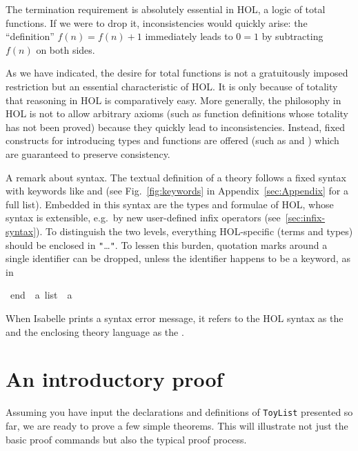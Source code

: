 \begin{isabellebody}
\begin{isamarkuptext}
The termination requirement is absolutely essential in HOL, a logic of total
functions. If we were to drop it, inconsistencies would quickly arise: the
``definition'' $f(n) = f(n)+1$ immediately leads to $0 = 1$ by subtracting
$f(n)$ on both sides.

\begin{warn}
  As we have indicated, the desire for total functions is not a gratuitously
  imposed restriction but an essential characteristic of HOL. It is only
  because of totality that reasoning in HOL is comparatively easy.  More
  generally, the philosophy in HOL is not to allow arbitrary axioms (such as
  function definitions whose totality has not been proved) because they
  quickly lead to inconsistencies. Instead, fixed constructs for introducing
  types and functions are offered (such as  and
  ) which are guaranteed to preserve consistency.
\end{warn}

A remark about syntax.  The textual definition of a theory follows a fixed
syntax with keywords like  and  (see
Fig.~\ref{fig:keywords} in Appendix~\ref{sec:Appendix} for a full list).
Embedded in this syntax are the types and formulae of HOL, whose syntax is
extensible, e.g.\ by new user-defined infix operators
(see~\ref{sec:infix-syntax}). To distinguish the two levels, everything
HOL-specific (terms and types) should be enclosed in
\texttt{"}\dots\texttt{"}. 
To lessen this burden, quotation marks around a single identifier can be
dropped, unless the identifier happens to be a keyword, as in%
\end{isamarkuptext}%
\ {\isachardoublequote}end{\isachardoublequote}\ {\isacharcolon}{\isacharcolon}\ {\isachardoublequote}{\isacharprime}a\ list\ {\isasymRightarrow}\ {\isacharprime}a{\isachardoublequote}%
\begin{isamarkuptext}%
\noindent
When Isabelle prints a syntax error message, it refers to the HOL syntax as
the  and the enclosing theory language as the .


\section{An introductory proof}
\label{sec:intro-proof}

Assuming you have input the declarations and definitions of \texttt{ToyList}
presented so far, we are ready to prove a few simple theorems. This will
illustrate not just the basic proof commands but also the typical proof
process.


\end{isamarkuptext}
\end{isabellebody}
